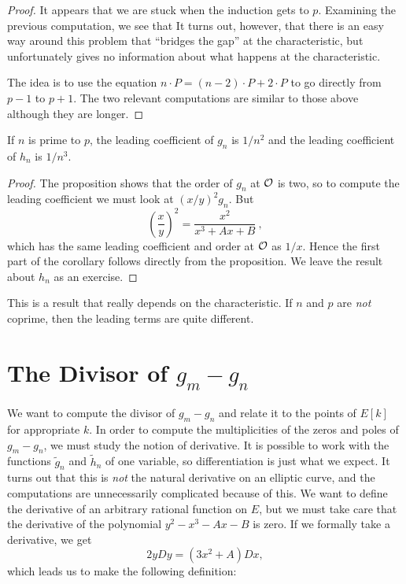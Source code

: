 \begin{proof}
It appears that we are stuck when the induction gets to $p$. Examining the previous computation, we see that
\iftoggle{modifiedversion}{%
$$(g_{p-1}/x)(\cuz)=1.$$
This is extremely unpleasant because $(g_{p-1}/x)(\cuz)-1$ is in the denominator.}{%
$$(g_{n-1}/x)(\cuz)-1=n\left(\frac{2-n}{n^{2}-2n+1}\right)\ .$$
If $n-1=p-1$, this is extremely unpleasant because it is in the denominator.}
It turns out, however, that there is an easy way around this problem that ``bridges the gap'' at the characteristic, but unfortunately gives no information about what happens at the characteristic.

The idea is to use the equation $n\cdot P=(n-2)\cdot P+2\cdot P$ to go directly from $p-1$ to $p+1$. The two relevant computations are similar to those above although they are longer.
\end{proof}
\begin{coro}
\label{c7.7}
If $n$ is prime to $p$, the leading coefficient of $g_{n}$ is $1/n^{2}$ and the leading coefficient of $h_{n}$ is $1/n^{3}$.
\end{coro}

\begin{proof} The proposition shows that the order of $g_{n}$ at $\mathcal{O}$ is two, so to compute the leading coefficient we must look at $(x/y)^{2}g_{n}$. But
$$
\left(\frac{x}{y}\right)^{2}=\frac{x^{2}}{x^{3}+Ax+B}\ ,
$$
which has the same leading coefficient and order at $\mathcal{O}$ as $1/x$. Hence the first part of the corollary follows directly from the proposition. We leave the result about $h_{n}$ as an exercise.
\end{proof}

\rem
This is a result that really depends on the characteristic. If $n$ and $p$ are {\it not} coprime, then the leading terms are quite different.

\section{The Divisor of $g_{m}-g_{n}$}
\label{sec8}

We want to compute the divisor of $g_{m}-g_{n}$ and relate it to the points of $E[k]$ for appropriate $k$. In order to compute the multiplicities of the zeros and poles of $g_{m}-g_{n}$, we must study the notion of derivative. It is possible to work with the functions $\tilde{g}_{n}$ and $\tilde{h}_{n}$ of one variable, so differentiation is just what we expect. It turns out that this is {\it not} the natural derivative on an elliptic curve, and the computations are unnecessarily complicated because of this. We want to define the derivative of an arbitrary rational function on $E$, but we must take care that the derivative of the polynomial $y^{2}-x^{3}-Ax-B$ is zero. If we formally take a derivative, we get
$$
2yDy=(3x^{2}+A)Dx,
$$
which leads us to make the following definition:


